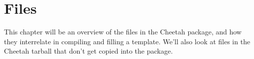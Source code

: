\section{Files}
\label{files}

This chapter will be an overview of the files in the Cheetah package,
and how they interrelate in compiling and filling a template.  We'll
also look at files in the Cheetah tarball that don't get copied into
the package.

